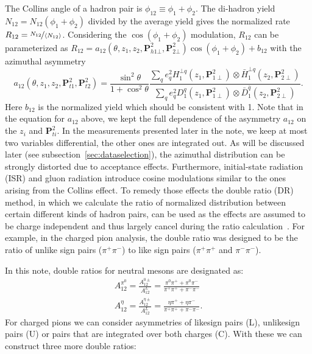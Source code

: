 The Collins angle of a hadron pair is $\phi_{12} \equiv \phi_1+\phi_2$. The di-hadron yield $N_{12}=N_{12}(\phi_1+\phi_2)$ divided by the average yield gives the normalized rate $R_{12}=\nicefrac{N_{12}}{\langle  N_{12}\rangle}$. Considering the $\cos(\phi_1+\phi_2)$ modulation, $R_{12}$ can be parameterized as $R_{12}=a_{12}(\theta,z_1,z_2, \boldsymbol{P}^2_{h1\bot},\boldsymbol{P}^2_{2\bot})\cos(\phi_1+\phi_2)+b_{12}$ with the azimuthal asymmetry
\begin{equation}
a_{12}(\theta,z_1,z_2, \boldsymbol{P}^2_{t1},\boldsymbol{P}^2_{t2})=\frac{\sin^2\theta}{1+\cos^2\theta}
\frac{\sum\limits_{q}e^2_qH^{\bot q}_1(z_1,\boldsymbol{P}^2_{1\perp})\otimes \bar{H}^{\bot q}_1(z_2,\boldsymbol{P}^2_{2\perp})}{\sum\limits_{q}e^2_qD^q_1(z_1,\boldsymbol{P}^2_{1\perp})\otimes \bar{D}^{\bar{q}}_1(z_2,\boldsymbol{P}^2_{2\perp})}.
\end{equation} 
Here $b_{12}$ is the normalized yield which should be consistent with 1.
Note that in the equation for $a_{12}$ above, we kept the full dependence of the asymmetry $a_{12}$ on the $z_i$ and $ \boldsymbol{P}^2_{ti}$. In the measurements presented later in the note, we keep at most two variables differential, the other ones are integrated out.
As will be discussed later (see subsection~\ref{sec:dataselection}), the azimuthal distribution can be strongly distorted due to acceptance effects. Furthermore, initial-state radiation (ISR) and gluon radiation introduce cosine modulations similar to the ones arising from the Collins effect. To remedy those effects the double ratio (DR) method, in which we calculate the ratio of normalized distribution between certain different kinds of hadron pairs, can be used as the effects are assumed to be charge independent and thus largely cancel during the ratio calculation~\cite{ChargedPionResult,CollinsInSIDISandEE}.  For example, in the charged pion analysis, the double ratio was designed to be the ratio of unlike sign pairs ($\pi^+\pi^-$) to like sign pairs ($\pi^+\pi^+$ and $\pi^-\pi^-$).


In this note, double ratios for neutral mesons are designated as:
\begin{equation}
\label{eqn:FF6}
\begin{aligned}
A_{12}^{\pi^0}=\frac{A^{0\pm}_{12}}{A^L_{12}}=\frac{\pi^0\pi^++\pi^0\pi^-}{\pi^+\pi^++\pi^-\pi^-}\\
A_{12}^{\eta}=\frac{A^{\eta\pm}_{12}}{A^L_{12}}=\frac{\eta\pi^++\eta\pi^-}{\pi^+\pi^++\pi^-\pi^-}.
\end{aligned}
\end{equation}
For charged pions we can consider asymmetries of likesign pairs (L), unlikesign pairs (U) or pairs that are integrated over both charges (C).
With these we can construct three more double ratios:

